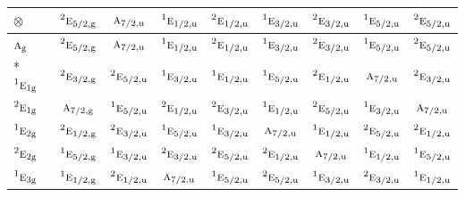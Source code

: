 \documentclass[10pt,a4paper]{article}
\numberwithin{equation}{section}
\newcommand{\irr}[1]{\text{\normalfont\scshape #1}}
\newcommand{\conjpair}[1]{{}^{#1}}
\newcommand{\ptag}[1]{\mathrm{#1}}
\newcommand{\irrprod}{\otimes}
\begin{document}
{\small\setlength{\tabcolsep}{3pt}\begin{longtable}{@{}lcccccccc@{}}\toprule
$\irrprod$ & $\conjpair{2}\irr{e}_{5/2,\ptag{g}}$ & $\irr{a}_{7/2,\ptag{u}}$ & $\conjpair{1}\irr{e}_{1/2,\ptag{u}}$ & $\conjpair{2}\irr{e}_{1/2,\ptag{u}}$ & $\conjpair{1}\irr{e}_{3/2,\ptag{u}}$ & $\conjpair{2}\irr{e}_{3/2,\ptag{u}}$ & $\conjpair{1}\irr{e}_{5/2,\ptag{u}}$ & $\conjpair{2}\irr{e}_{5/2,\ptag{u}}$\\\midrule\endhead
\bottomrule\endfoot\endlastfoot
$\irr{a}_{\ptag{g}}$ & $\conjpair{2}\irr{e}_{5/2,\ptag{g}}$ & $\irr{a}_{7/2,\ptag{u}}$ & $\conjpair{1}\irr{e}_{1/2,\ptag{u}}$ & $\conjpair{2}\irr{e}_{1/2,\ptag{u}}$ & $\conjpair{1}\irr{e}_{3/2,\ptag{u}}$ & $\conjpair{2}\irr{e}_{3/2,\ptag{u}}$ & $\conjpair{1}\irr{e}_{5/2,\ptag{u}}$ & $\conjpair{2}\irr{e}_{5/2,\ptag{u}}$\\*
$\conjpair{1}\irr{e}_{1\ptag{g}}$ & $\conjpair{2}\irr{e}_{3/2,\ptag{g}}$ & $\conjpair{2}\irr{e}_{5/2,\ptag{u}}$ & $\conjpair{1}\irr{e}_{3/2,\ptag{u}}$ & $\conjpair{1}\irr{e}_{1/2,\ptag{u}}$ & $\conjpair{1}\irr{e}_{5/2,\ptag{u}}$ & $\conjpair{2}\irr{e}_{1/2,\ptag{u}}$ & $\irr{a}_{7/2,\ptag{u}}$ & $\conjpair{2}\irr{e}_{3/2,\ptag{u}}$\\
$\conjpair{2}\irr{e}_{1\ptag{g}}$ & $\irr{a}_{7/2,\ptag{g}}$ & $\conjpair{1}\irr{e}_{5/2,\ptag{u}}$ & $\conjpair{2}\irr{e}_{1/2,\ptag{u}}$ & $\conjpair{2}\irr{e}_{3/2,\ptag{u}}$ & $\conjpair{1}\irr{e}_{1/2,\ptag{u}}$ & $\conjpair{2}\irr{e}_{5/2,\ptag{u}}$ & $\conjpair{1}\irr{e}_{3/2,\ptag{u}}$ & $\irr{a}_{7/2,\ptag{u}}$\\
$\conjpair{1}\irr{e}_{2\ptag{g}}$ & $\conjpair{2}\irr{e}_{1/2,\ptag{g}}$ & $\conjpair{2}\irr{e}_{3/2,\ptag{u}}$ & $\conjpair{1}\irr{e}_{5/2,\ptag{u}}$ & $\conjpair{1}\irr{e}_{3/2,\ptag{u}}$ & $\irr{a}_{7/2,\ptag{u}}$ & $\conjpair{1}\irr{e}_{1/2,\ptag{u}}$ & $\conjpair{2}\irr{e}_{5/2,\ptag{u}}$ & $\conjpair{2}\irr{e}_{1/2,\ptag{u}}$\\
$\conjpair{2}\irr{e}_{2\ptag{g}}$ & $\conjpair{1}\irr{e}_{5/2,\ptag{g}}$ & $\conjpair{1}\irr{e}_{3/2,\ptag{u}}$ & $\conjpair{2}\irr{e}_{3/2,\ptag{u}}$ & $\conjpair{2}\irr{e}_{5/2,\ptag{u}}$ & $\conjpair{2}\irr{e}_{1/2,\ptag{u}}$ & $\irr{a}_{7/2,\ptag{u}}$ & $\conjpair{1}\irr{e}_{1/2,\ptag{u}}$ & $\conjpair{1}\irr{e}_{5/2,\ptag{u}}$\\
$\conjpair{1}\irr{e}_{3\ptag{g}}$ & $\conjpair{1}\irr{e}_{1/2,\ptag{g}}$ & $\conjpair{2}\irr{e}_{1/2,\ptag{u}}$ & $\irr{a}_{7/2,\ptag{u}}$ & $\conjpair{1}\irr{e}_{5/2,\ptag{u}}$ & $\conjpair{2}\irr{e}_{5/2,\ptag{u}}$ & $\conjpair{1}\irr{e}_{3/2,\ptag{u}}$ & $\conjpair{2}\irr{e}_{3/2,\ptag{u}}$ & $\conjpair{1}\irr{e}_{1/2,\ptag{u}}$\\

\end{longtable}}
\end{document}
